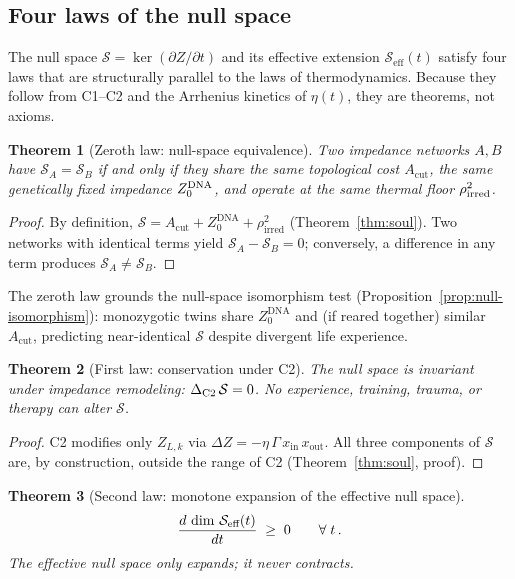\documentclass[aps,pre,twocolumn,superscriptaddress,floatfix]{revtex4-2}
\newtheorem{theorem}{Theorem}
\newcommand{\Acut}{A_{\text{cut}}}
\begin{document}
\subsection{Four laws of the null space}
\label{sec:four-laws}

The null space $\mathcal{S}=\ker(\partial Z/\partial t)$
and its effective extension $\mathcal{S}_{\text{eff}}(t)$
satisfy four laws that are structurally parallel to the
laws of thermodynamics.
Because they follow from C1--C2 and the Arrhenius kinetics
of $\eta(t)$, they are theorems, not axioms.

\begin{theorem}[Zeroth law: null-space equivalence]
\label{thm:zeroth-law}
Two impedance networks $A,B$ have
$\mathcal{S}_A = \mathcal{S}_B$ if and only if they share
the same topological cost $\Acut$,
the same genetically fixed impedance $Z_0^{\textnormal{DNA}}$, and
operate at the same thermal floor
$\rho_{\textnormal{irred}}^2$.
\end{theorem}

\begin{proof}
By definition,
$\mathcal{S}=\Acut + Z_0^{\text{DNA}} + \rho_{\text{irred}}^2$
(Theorem~\ref{thm:soul}).
Two networks with identical terms yield
$\mathcal{S}_A-\mathcal{S}_B = 0$; conversely, a difference
in any term produces $\mathcal{S}_A \neq \mathcal{S}_B$.
\end{proof}

The zeroth law grounds the null-space isomorphism test
(Proposition~\ref{prop:null-isomorphism}):
monozygotic twins share $Z_0^{\text{DNA}}$
and (if reared together) similar $\Acut$, predicting
near-identical $\mathcal{S}$ despite divergent life
experience.

\begin{theorem}[First law: conservation under C2]
\label{thm:first-law}
The null space is invariant under impedance remodeling:
$\Delta_{\textnormal{C2}}\,\mathcal{S} = 0$.
No experience, training, trauma, or therapy can alter
$\mathcal{S}$.
\end{theorem}

\begin{proof}
C2 modifies only $Z_{L,k}$ via
$\Delta Z = -\eta\,\Gamma\,x_{\text{in}}\,x_{\text{out}}$.
All three components of $\mathcal{S}$ are, by construction,
outside the range of C2 (Theorem~\ref{thm:soul}, proof).
\end{proof}

\begin{theorem}[Second law: monotone expansion of the
effective null space]
\label{thm:second-law}
\begin{equation}
  \frac{d\,\dim\,\mathcal{S}_{\textnormal{eff}}(t)}{dt}
  \;\ge\; 0
  \qquad \forall\;t\,.
  \label{eq:second-law}
\end{equation}
The effective null space only expands; it never contracts.
\end{theorem}
\end{document}
